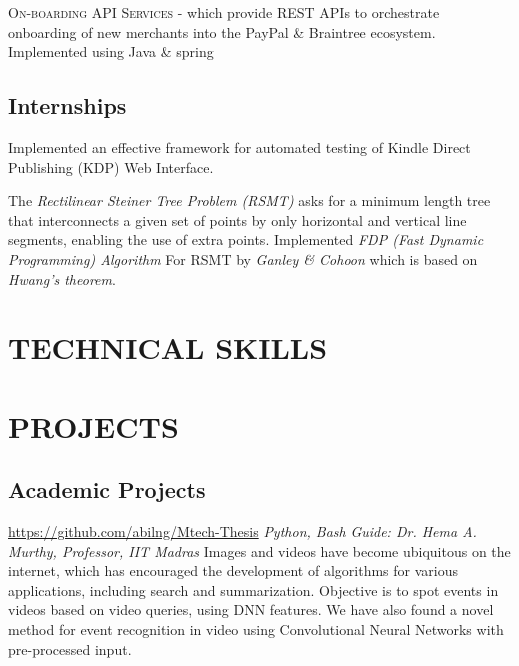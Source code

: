 \documentclass[11pt, a4paper, sans]{moderncv}
\begin{document}
{\textsc{On-boarding API Services} - which provide REST APIs to orchestrate onboarding of new merchants into the PayPal \& Braintree ecosystem. Implemented using Java \& spring \newline} 

\subsection{Internships}
{Implemented an effective framework for automated testing of Kindle Direct Publishing (KDP) Web Interface.}

{The \textit{Rectilinear Steiner Tree Problem (RSMT)} asks for a minimum length tree that interconnects a given set of points by only horizontal and vertical line segments, enabling the use of extra points. Implemented \textit{ FDP (Fast Dynamic Programming) Algorithm } For RSMT by \textit{ Ganley \& Cohoon } which is based on \textit{ Hwang’s theorem}}.

\section{TECHNICAL SKILLS}

\section{PROJECTS}
\subsection{Academic Projects}
{\newline \url{https://github.com/abilng/Mtech-Thesis}}
{\hfill \textit{Python, Bash}}
{\newline \textit{Guide: Dr. Hema A. Murthy, Professor, IIT Madras}}
{Images and videos have become ubiquitous on the internet, which has encouraged the development of algorithms for various applications, including search and summarization. Objective is to spot events in videos based on video queries, using DNN features. We have also found a novel method for event recognition in video using Convolutional Neural Networks with pre-processed input.}
\end{document}
